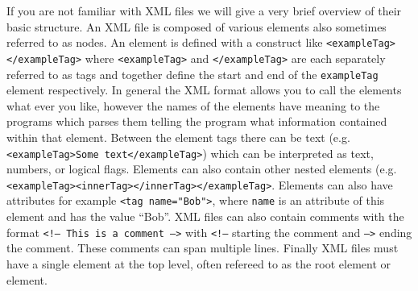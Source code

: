 \documentclass[12pt,a4paper]{book}
\begin{document}
If you are not familiar with XML files we will give a very brief overview of their basic structure. An XML file is composed of various elements also sometimes referred to as nodes. An element is defined with a construct like {\tt <exampleTag> </exampleTag>} where {\tt <exampleTag>} and {\tt </exampleTag>} are each separately referred to as tags and together define the start and end of the {\tt exampleTag} element respectively. In general the XML format allows you to call the elements what ever you like, however the names of the elements have meaning to the programs which parses them telling the program what information contained within that element. Between the element tags there can be text (e.g. {\tt <exampleTag>Some text</exampleTag>}) which can be interpreted as text, numbers, or logical flags. Elements can also contain other nested elements (e.g. {\tt <exampleTag><innerTag></innerTag></exampleTag>}. Elements can also have attributes for example {\tt <tag name="Bob">}, where {\tt name} is an attribute of this element and has the value ``Bob''. XML files can also contain comments with the format {\tt <!-- This is a comment -->} with {\tt <!--} starting the comment and {\tt -->} ending the comment. These comments can span multiple lines. Finally XML files must have a single element at the top level, often refereed to as the root element or element.
\end{document}
